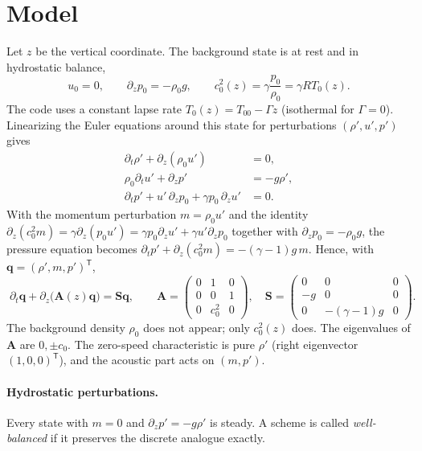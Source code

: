 \documentclass[11pt,a4paper]{article}
\newcommand{\q}{\bm q}
\begin{document}
\section{Model}
Let $z$ be the vertical coordinate. The background state is at rest and in hydrostatic balance,
\begin{equation}
u_0=0,\qquad \partial_z p_0 = -\rho_0 g,\qquad c_0^2(z)=\gamma\frac{p_0}{\rho_0}=\gamma R T_0(z).
\end{equation}
The code uses a constant lapse rate $T_0(z)=T_{00}-\Gamma z$ (isothermal for $\Gamma=0$).
Linearizing the Euler equations around this state for perturbations $(\rho',u',p')$ gives
\begin{align}
\partial_t\rho' + \partial_z(\rho_0 u') &= 0,\\
\rho_0\partial_t u' + \partial_z p' &= -g\rho',\\
\partial_t p' + u'\,\partial_z p_0 + \gamma p_0\,\partial_z u' &= 0 .
\end{align}
With the momentum perturbation $m=\rho_0u'$ and the identity
$\partial_z(c_0^2 m)=\gamma\partial_z(p_0u') = \gamma p_0\partial_z u' + \gamma u'\partial_z p_0$
together with $\partial_z p_0=-\rho_0 g$, the pressure equation becomes
$\partial_t p' + \partial_z(c_0^2 m) = -(\gamma-1)g\,m$. Hence, with $\q=(\rho',m,p')^{\mathsf T}$,
\begin{equation}\label{eq:model}
\boxed{\;\partial_t\q + \partial_z\big(\bm A(z)\q\big) = \bm S\q,\qquad
\bm A=\begin{pmatrix}0&1&0\\0&0&1\\0&c_0^2&0\end{pmatrix},\quad
\bm S=\begin{pmatrix}0&0&0\\-g&0&0\\0&-(\gamma-1)g&0\end{pmatrix}.\;}
\end{equation}
The background density $\rho_0$ does not appear; only $c_0^2(z)$ does. The eigenvalues of $\bm A$
are $0,\pm c_0$. The zero-speed characteristic is pure $\rho'$ (right eigenvector $(1,0,0)^{\mathsf T}$),
and the acoustic part acts on $(m,p')$.

\paragraph{Hydrostatic perturbations.} Every state with $m=0$ and $\partial_z p'=-g\rho'$ is
steady. A scheme is called \emph{well-balanced} if it preserves the discrete analogue exactly.
\end{document}
